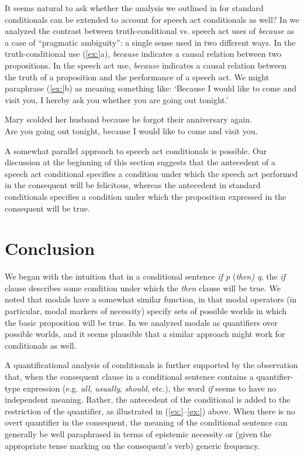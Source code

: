 It seems natural to ask whether the analysis we outlined in  for standard conditionals can be extended to account for speech act conditionals as well? In  we analyzed the contrast between truth-conditional vs. speech act uses of \textit{because} as a case of “pragmatic ambiguity”: a single sense used in two different ways. In the truth-conditional use (\ref{ex:}a), \textit{because} indicates a causal relation between two propositions. In the speech act use, \textit{because} indicates a causal relation between the truth of a proposition and the performance of a speech act. We might paraphrase (\ref{ex:}b) as meaning something like: ‘Because I would like to come and visit you, I hereby ask you whether you are going out tonight.’


\ea
\ea Mary scolded her husband because he forgot their anniversary again.\\
\ex Are you going out tonight, because I would like to come and visit you.
                       \z
\z


A somewhat parallel approach to speech act conditionals is possible. Our discussion at the beginning of this section suggests that the antecedent of a speech act conditional specifies a condition under which the speech act performed in the consequent will be felicitous, whereas the antecedent in standard conditionals specifies a condition under which the proposition expressed in the consequent will be true.


\section{Conclusion}\label{sec:} %

We began with the intuition that in a conditional sentence \textit{if p} (\textit{then) q}, the \textit{if} clause describes some condition under which the \textit{then} clause will be true. We noted that modals have a somewhat similar function, in that modal operators (in particular, modal markers of necessity) specify sets of possible worlds in which the basic proposition will be true. In  we analyzed modals as quantifiers over possible worlds, and it seems plausible that a similar approach might work for conditionals as well.



A quantificational analysis of conditionals is further supported by the observation that, when the consequent clause in a conditional sentence contains a quantifier-type expression (e.g. \textit{all}, \textit{usually}, \textit{should}, etc.), the word \textit{if} seems to have no independent meaning. Rather, the antecedent of the conditional is added to the restriction of the quantifier, as illustrated in (\ref{ex:}--\ref{ex:}) above. When there is no overt quantifier in the consequent, the meaning of the conditional sentence can generally be well paraphrased in terms of epistemic necessity or (given the appropriate tense marking on the consequent’s verb) generic frequency.



